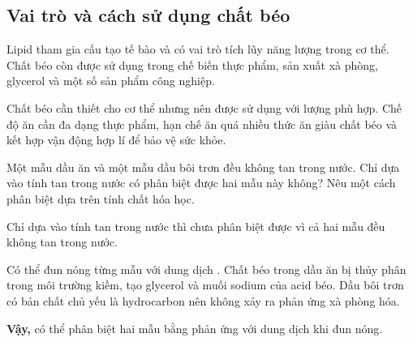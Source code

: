\subsection{Vai trò và cách sử dụng chất béo}

Lipid tham gia cấu tạo tế bào và có vai trò tích lũy năng lượng trong cơ thể. Chất béo còn được sử dụng trong chế biến thực phẩm, sản xuất xà phòng, glycerol và một số sản phẩm công nghiệp.

Chất béo cần thiết cho cơ thể nhưng nên được sử dụng với lượng phù hợp. Chế độ ăn cần đa dạng thực phẩm, hạn chế ăn quá nhiều thức ăn giàu chất béo và kết hợp vận động hợp lí để bảo vệ sức khỏe.

\begin{vidu}
Một mẫu dầu ăn và một mẫu dầu bôi trơn đều không tan trong nước. Chỉ dựa vào tính tan trong nước có phân biệt được hai mẫu này không? Nêu một cách phân biệt dựa trên tính chất hóa học.
\end{vidu}
\begin{loigiai}
Chỉ dựa vào tính tan trong nước thì chưa phân biệt được vì cả hai mẫu đều không tan trong nước.

Có thể đun nóng từng mẫu với dung dịch . Chất béo trong dầu ăn bị thủy phân trong môi trường kiềm, tạo glycerol và muối sodium của acid béo. Dầu bôi trơn có bản chất chủ yếu là hydrocarbon nên không xảy ra phản ứng xà phòng hóa.

\textbf{Vậy,} có thể phân biệt hai mẫu bằng phản ứng với dung dịch  khi đun nóng.
\end{loigiai}
